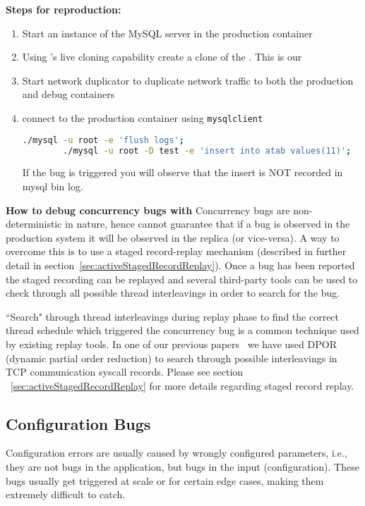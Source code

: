 \noindent \textbf{Steps for reproduction:} \\

\begin{adjustwidth}{0.5cm}{}
	\begin{enumerate}
		\item Start an instance of the MySQL server in the production container
		\item Using \parikshan's live cloning capability create a clone of the \productioncontainer. This is our \debugcontainer
		\item Start network duplicator to duplicate network traffic to both the production and debug containers
		\item connect to the production container using \texttt{mysqlclient}
		
		\begin{lstlisting}[language=sh]
		./mysql -u root -e 'flush logs';
		./mysql -u root -D test -e 'insert into atab values(11)';
		\end{lstlisting}
		
		If the bug is triggered you will observe that the insert is NOT recorded in mysql bin log.
		
	\end{enumerate}
\end{adjustwidth}


\textbf{How to debug concurrency bugs with \parikshan}
Concurrency bugs are non-deterministic in nature, hence \parikshan cannot guarantee that if a bug is observed in the production system it will be observed in the replica (or vice-versa). A way to overcome this is to use a staged record-replay mechanism (described in further detail in section~\ref{sec:activeStagedRecordReplay}). Once a bug has been reported the staged recording can be replayed and several third-party tools can be used to check through all possible thread interleavings in order to search for the bug. 

``Search" through thread interleavings during replay phase to find the correct thread schedule which triggered the concurrency bug is a common technique used by existing replay tools. In one of our previous papers~\cite{best} we have used DPOR (dynamic partial order reduction) to search through possible interleavings in TCP communication syscall records. Please see section ~\ref{sec:activeStagedRecordReplay} for more details regarding staged record replay.

\subsection{Configuration Bugs}
Configuration errors are usually caused by wrongly configured parameters, i.e., they are not bugs in the application, but bugs in the input (configuration).
These bugs usually get triggered at scale or for certain edge cases, making them extremely difficult to catch.


